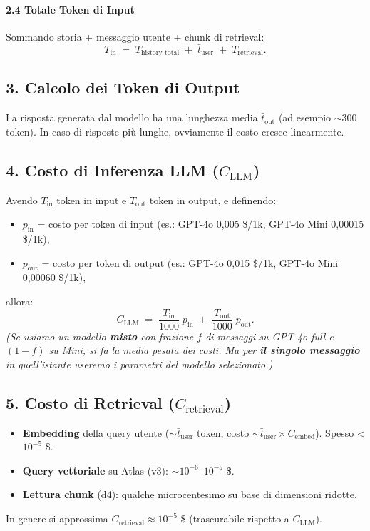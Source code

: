 \documentclass{article}
\begin{document}
\paragraph{2.4 Totale Token di Input}
Sommando storia + messaggio utente + chunk di retrieval:
\[
T_{\text{in}}
\;=\;
T_{\text{history\_total}}
\;+\;
\bar{t}_{\text{user}}
\;+\;
T_{\text{retrieval}}.
\]

\subsection*{3. Calcolo dei Token di Output}
La risposta generata dal modello ha una lunghezza media \(\bar{t}_{\text{out}}\) (ad esempio $\sim$300 token). In caso di risposte più lunghe, ovviamente il costo cresce linearmente.

\subsection*{4. Costo di Inferenza LLM (\(C_{\text{LLM}}\))}
Avendo \(\displaystyle T_{\text{in}}\) token in input e \(\displaystyle T_{\text{out}}\) token in output, e definendo:
\begin{itemize}
    \item \(p_{\text{in}}\) = costo per token di input (es.: GPT-4o 0,005 \$/1k, GPT-4o Mini 0,00015 \$/1k),
    \item \(p_{\text{out}}\) = costo per token di output (es.: GPT-4o 0,015 \$/1k, GPT-4o Mini 0,00060 \$/1k),
\end{itemize}
allora:
\[
C_{\text{LLM}}
\;=\;
\frac{T_{\text{in}}}{1000} \; p_{\text{in}}
\;+\;
\frac{T_{\text{out}}}{1000} \; p_{\text{out}}.
\]
\emph{(Se usiamo un modello \textbf{misto} con frazione $f$ di messaggi su GPT-4o full e $(1-f)$ su Mini, si fa la media pesata dei costi. Ma per \textbf{il singolo messaggio} in quell'istante useremo i parametri del modello selezionato.)}

\subsection*{5. Costo di Retrieval (\(C_{\text{retrieval}}\))}
\begin{itemize}
    \item \textbf{Embedding} della query utente ($\sim \bar{t}_{\text{user}}$ token, costo $\sim \bar{t}_{\text{user}} \times C_{\text{embed}}$). Spesso < $10^{-5}$ \$.
    \item \textbf{Query vettoriale} su Atlas (v3): $\sim 10^{-6}$--$10^{-5}$ \$.
    \item \textbf{Lettura chunk} (d4): qualche microcentesimo su base di dimensioni ridotte.
\end{itemize}
In genere si approssima $C_{\text{retrieval}} \approx 10^{-5}$ \$ (trascurabile rispetto a $C_{\text{LLM}}$).
\end{document}
